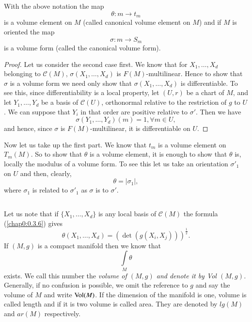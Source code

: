 \subsection{}\label{chap3:3.5.1}

\begin{prop*}
With \pageoriginale the above notation the map
$$
\theta:m\to t_{m}
$$
is a volume element on $M$ (called canonical volume element on
  $M$) and if $M$ is oriented the map  
$$
\sigma:m\to S_{m}
$$
is a volume form (called the canonical volume form).
\end{prop*}

\begin{proof}
Let us consider the second case first. We know that for
{\small $X_{1},\ldots,X_{d}$} belonging to $\mathscr{C}(M)$,
$\sigma(X_{1},\ldots,X_{d})$ is $F(M)$-multilinear. Hence to show that
$\sigma$ is a volume form we need only show that
$\sigma(X_{1},\ldots,X_{d})$ is differentiable. To see this, since
differentiability is a local property, let $(U,r)$ be a chart of $M$,
and let $Y_{1},\ldots,Y_{d}$ be a basis of $\mathscr{C}(U)$,
orthonormal relative to the restriction of $g$ to $U$. We can suppose
that $Y_{i}$ in that order are positive relative to $\sigma'$. Then we
have
$$
\sigma(Y_{1},\ldots,Y_{d})(m)=1,\forall m\in U,
$$
and hence, since $\sigma$ is $F(M)$-multilinear, it is differentiable
on $U$.
\end{proof}

Now let us take up the first part. We know that $t_{m}$ is a volume
element on $T_{m}(M)$. So to show that $\theta$ is a volume element,
it is enough to show that $\theta$ is, locally the modulus of a volume
form. To see this let us take an orientation $\sigma'_{1}$ on $U$ and
then, clearly,
$$
\theta=|\sigma_{1}|,
$$
where $\sigma_{1}$ is related to $\sigma'_{1}$ as $\sigma$ is to
$\sigma'$.

\setcounter{subsection}{1}
\subsection{}\label{chap3:3.5.2}\pageoriginale

Let us note that if \; $\{X_{1},\ldots,X_{d}\}$ is any local basis of
$\mathscr{C}(M)$ the formula (\ref{chap0:0.3.6}) gives
$$
\theta(X_{1},\ldots,X_{d})=(\det(g(X_{i},X_{j})))^{\frac{1}{2}}.
$$
If $(M,g)$ is a compact manifold then we know that
$$
\int\limits_{M}\theta
$$
exists. We call this number the {\em volume of $(M,g)$ and denote it
  by Vol $(M,g)$.} Generally, if no confusion is possible, we omit the
reference to $g$ and say the volume of $M$ and write $\operatorname{Vol}(M)$. If the
dimension of the manifold is one, volume is called length and if it is
two volume is called area. They are denoted by $lg(M)$ and $ar(M)$
respectively.

